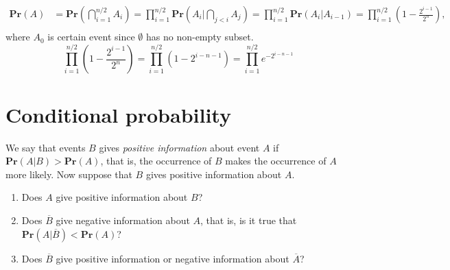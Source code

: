 \documentclass[a4paper, justified]{tufte-handout}
\begin{document}
\begin{solution}
  \[
  \begin{aligned}
    \mathbf{Pr}(A) &= \mathbf{Pr}(\bigcap_{i=1}^{n/2} A_i) = \prod_{i=1}^{n/2} \mathbf{Pr}(A_i|\bigcap_{j<i}A_j) = \prod_{i=1}^{n/2} \mathbf{Pr}(A_i|A_{i-1}) = \prod_{i=1}^{n/2} \left(1 - \frac{2^{i-1}}{2^n}\right),\\
  \end{aligned}
  \]
  where $A_0$ is certain event since $\emptyset$ has no non-empty subset.\\
  \[\prod_{i=1}^{n/2} \left(1 - \frac{2^{i-1}}{2^n}\right) = \prod_{i=1}^{n/2} \left(1 - 2^{i-n-1}\right) = \prod_{i=1}^{n/2}e^{-2^{i-n-1}}\]
\end{solution}

\section{Conditional probability}

\begin{problem}
  We say that events \(B\) gives \textit{positive information} about event \(A\) if \(\mathbf{Pr}(A|B) > \mathbf{Pr}(A)\), that is, the occurrence of \(B\) makes the occurrence of \(A\) more likely. Now suppose that \(B\) gives positive information about \(A\).
  \begin{enumerate}
    \item Does \(A\) give positive information about \(B\)?
    \item Does \(\overline{B}\) give negative information about \(A\), that is, is it true that \(\mathbf{Pr}(A|\overline{B}) < \mathbf{Pr}(A)\)?
    \item Does \(\overline{B}\) give positive information or negative information about \(\overline{A}\)?
  \end{enumerate}
\end{problem}
\end{document}
